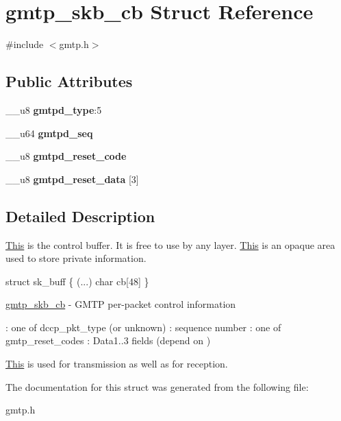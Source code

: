\hypertarget{structgmtp__skb__cb}{\section{gmtp\-\_\-skb\-\_\-cb Struct Reference}
\label{structgmtp__skb__cb}
}


{\ttfamily \#include $<$gmtp.\-h$>$}

\subsection*{Public Attributes}
\begin{DoxyCompactItemize}
\item 
\hypertarget{structgmtp__skb__cb_a40635375f5d8223a8de70b79833c32c2}{\-\_\-\-\_\-u8 {\bfseries gmtpd\-\_\-type}\-:5}\label{structgmtp__skb__cb_a40635375f5d8223a8de70b79833c32c2}

\item 
\hypertarget{structgmtp__skb__cb_ac2ed3bbe3289ce05b2fa7847c5e67da6}{\-\_\-\-\_\-u64 {\bfseries gmtpd\-\_\-seq}}\label{structgmtp__skb__cb_ac2ed3bbe3289ce05b2fa7847c5e67da6}

\item 
\hypertarget{structgmtp__skb__cb_a5f970494c68fc06c84823c233ed9d6a8}{\-\_\-\-\_\-u8 {\bfseries gmtpd\-\_\-reset\-\_\-code}}\label{structgmtp__skb__cb_a5f970494c68fc06c84823c233ed9d6a8}

\item 
\hypertarget{structgmtp__skb__cb_a766db441c404018311173c1171ef917a}{\-\_\-\-\_\-u8 {\bfseries gmtpd\-\_\-reset\-\_\-data} \mbox{[}3\mbox{]}}\label{structgmtp__skb__cb_a766db441c404018311173c1171ef917a}

\end{DoxyCompactItemize}


\subsection{Detailed Description}
\hyperlink{protocolThis-p}{This} is the control buffer. It is free to use by any layer. \hyperlink{protocolThis-p}{This} is an opaque area used to store private information.

struct sk\-\_\-buff \{ (...) char cb\mbox{[}48\mbox{]} \}

\hyperlink{structgmtp__skb__cb}{gmtp\-\_\-skb\-\_\-cb} -\/ G\-M\-T\-P per-\/packet control information

\-: one of dccp\-\_\-pkt\-\_\-type (or unknown) \-: sequence number \-: one of gmtp\-\_\-reset\-\_\-codes \-: Data1..3 fields (depend on )

\hyperlink{protocolThis-p}{This} is used for transmission as well as for reception. 

The documentation for this struct was generated from the following file\-:\begin{DoxyCompactItemize}
\item 
gmtp.\-h\end{DoxyCompactItemize}
